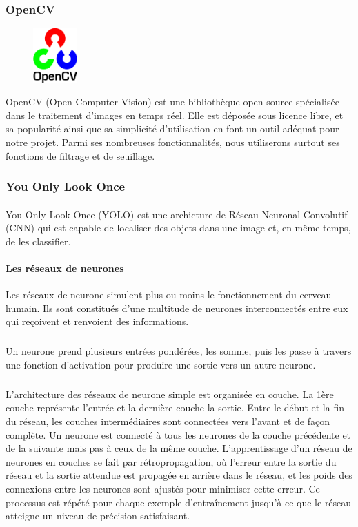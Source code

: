 \documentclass[a4paper]{article}
\begin{document}
			\subsubsection{OpenCV}
				\begin{figure}
					\includegraphics[width=0.15\textwidth]{OpenCV.png}
				\end{figure}
				OpenCV (Open Computer Vision) est une bibliothèque open source spécialisée dans le traitement d'images en temps réel.
				Elle est déposée sous licence libre, et sa popularité ainsi que sa simplicité d'utilisation en font un outil adéquat pour notre projet.
				Parmi ses nombreuses fonctionnalités, nous utiliserons surtout ses fonctions de filtrage et de seuillage.
				
				\newline
			\subsubsection{You Only Look Once}
				\paragraph{}
				You Only Look Once (YOLO) est une archicture de Réseau Neuronal Convolutif (CNN) qui est capable de localiser des objets dans une image et, en même temps, de les classifier.

				\paragraph{Les réseaux de neurones}
					Les réseaux de neurone simulent plus ou moins le fonctionnement du cerveau humain. Ils sont constitués d'une multitude de neurones interconnectés entre eux qui reçoivent et renvoient des informations.
					\subparagraph{} Un neurone prend plusieurs entrées pondérées, les somme, puis les passe à travers une fonction d'activation pour produire une sortie vers un autre neurone.
					\subparagraph{} L'architecture des réseaux de neurone simple est organisée en couche. La 1ère couche représente l'entrée et la dernière couche la sortie.
					Entre le début et la fin du réseau, les couches intermédiaires sont connectées vers l'avant et de façon complète. Un neurone est connecté à tous les neurones de la couche précédente et de la suivante mais pas à ceux de la même couche.
					L'apprentissage d'un réseau de neurones en couches se fait par rétropropagation, où l'erreur entre la sortie du réseau et la sortie attendue est propagée en arrière dans le réseau, et les poids des connexions entre les neurones sont ajustés pour minimiser cette erreur.
					Ce processus est répété pour chaque exemple d'entraînement jusqu'à ce que le réseau atteigne un niveau de précision satisfaisant.	
						
\end{document}
